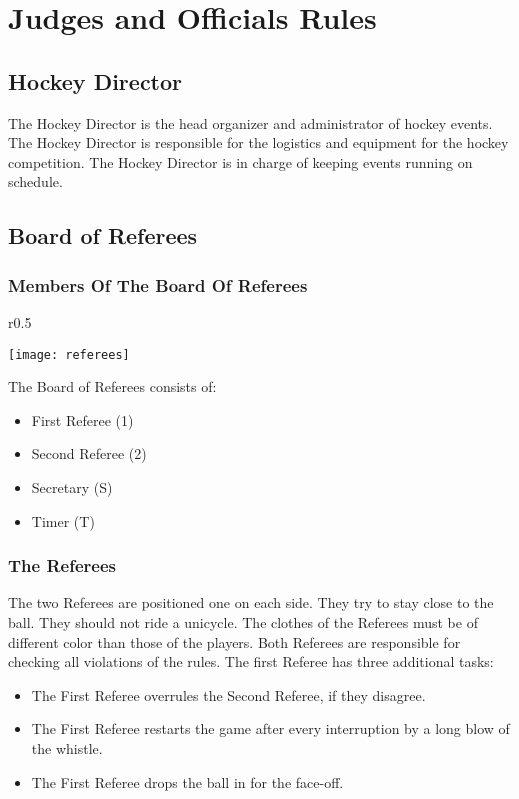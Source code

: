 \chapter{Judges and Officials Rules}

\section{Hockey Director}

The Hockey Director is the head organizer and administrator of hockey events.
The Hockey Director is responsible for the logistics and equipment for the hockey competition.
The Hockey Director is in charge of keeping events running on schedule.

\section{Board of Referees}

\subsection{Members Of The Board Of Referees}
\begin{wrapfigure}{r}{0.5\textwidth}
\begin{center}
\texttt{[image: referees]}
\end{center}
\end{wrapfigure}
 The Board of Referees consists of:
\begin{itemize}
\item First Referee (1)
\item Second Referee (2)
\item Secretary (S)
\item Timer (T)
\end{itemize}

\subsection{The Referees}
The two Referees are positioned one on each side.
They try to stay close to the ball.
They should not ride a unicycle.
The clothes of the Referees must be of different color than those of the players.
Both Referees are responsible for checking all violations of the rules.
The first Referee has three additional tasks:
\begin{itemize}
\item The First Referee overrules the Second Referee, if they disagree.
\item The First Referee restarts the game after every interruption by a long blow of the whistle.
\item The First Referee drops the ball in for the face-off.
\end{itemize}

